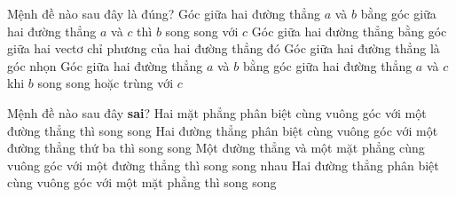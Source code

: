 	
	\begin{ex}%
		Mệnh đề nào sau đây là đúng?
		\choice
		{Góc giữa hai đường thẳng $a$ và $b$ bằng góc giữa hai đường thẳng $a$ và $c$ thì $b$ song song với $c$}
		{Góc giữa hai đường thẳng bằng góc giữa hai vectơ chỉ phương của hai đường thẳng đó}
		{Góc giữa hai đường thẳng là góc nhọn}
		{\True Góc giữa hai đường thẳng $a$ và $b$ bằng góc giữa hai đường thẳng $a$ và $c$ khi $b$ song song hoặc trùng với $c$}
	\end{ex}
	
	\begin{ex}%
		Mệnh đề nào sau đây \textbf{sai}?
		\choice 
		{ Hai mặt phẳng phân biệt cùng vuông góc với một đường thẳng thì song song} 
		{\True Hai đường thẳng phân biệt cùng vuông góc với một đường thẳng thứ ba thì song song} 
		{ Một đường thẳng và một mặt phẳng cùng vuông góc với một đường thẳng thì song song nhau} 
		{ Hai đường thẳng phân biệt cùng vuông góc với một mặt phẳng thì song song	}
	\end{ex}
	
